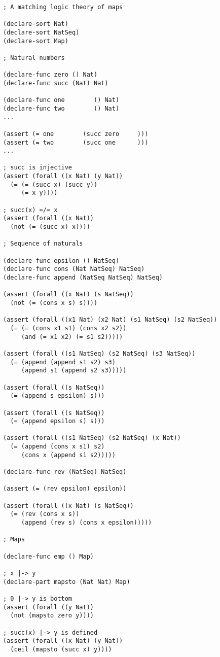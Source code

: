 \documentclass{article}
\theoremstyle{plain}
\begin{document}
\lstset{style=smt}
\begin{lstlisting}
; A matching logic theory of maps

(declare-sort Nat)
(declare-sort NatSeq)
(declare-sort Map)

; Natural numbers

(declare-func zero () Nat)
(declare-func succ (Nat) Nat)

(declare-func one        () Nat)
(declare-func two        () Nat)
...

(assert (= one        (succ zero     ))) 
(assert (= two        (succ one      ))) 
...

; succ is injective
(assert (forall ((x Nat) (y Nat))
  (= (= (succ x) (succ y))
     (= x y))))

; succ(x) =/= x
(assert (forall ((x Nat))
  (not (= (succ x) x))))

; Sequence of naturals

(declare-func epsilon () NatSeq)
(declare-func cons (Nat NatSeq) NatSeq)
(declare-func append (NatSeq NatSeq) NatSeq)

(assert (forall ((x Nat) (s NatSeq))
  (not (= (cons x s) s))))

(assert (forall ((x1 Nat) (x2 Nat) (s1 NatSeq) (s2 NatSeq))
  (= (= (cons x1 s1) (cons x2 s2))
     (and (= x1 x2) (= s1 s2)))))

(assert (forall ((s1 NatSeq) (s2 NatSeq) (s3 NatSeq))
  (= (append (append s1 s2) s3)
     (append s1 (append s2 s3)))))

(assert (forall ((s NatSeq))
  (= (append s epsilon) s)))

(assert (forall ((s NatSeq))
  (= (append epsilon s) s)))

(assert (forall ((s1 NatSeq) (s2 NatSeq) (x Nat))
  (= (append (cons x s1) s2)
     (cons x (append s1 s2)))))

(declare-func rev (NatSeq) NatSeq)

(assert (= (rev epsilon) epsilon))

(assert (forall ((x Nat) (s NatSeq))
  (= (rev (cons x s))
     (append (rev s) (cons x epsilon)))))

; Maps

(declare-func emp () Map)

; x |-> y
(declare-part mapsto (Nat Nat) Map)

; 0 |-> y is bottom
(assert (forall ((y Nat))
  (not (mapsto zero y))))

; succ(x) |-> y is defined 
(assert (forall ((x Nat) (y Nat))
  (ceil (mapsto (succ x) y))))


\end{lstlisting}
\end{document}
